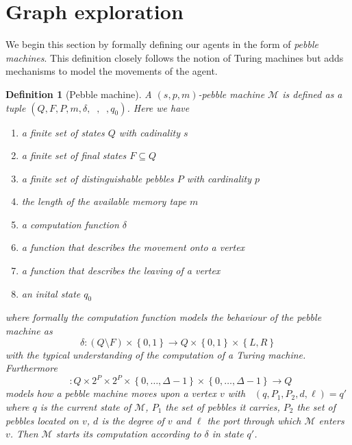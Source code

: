 \documentclass[oneside]{scrartcl}
\newtheorem{definition}{Definition}
\DeclareMathOperator{\din}{\delta_{\mathit{in}}}
\DeclareMathOperator{\dout}{\delta_{\mathit{out}}}
\begin{document}
\section{Graph exploration}
We begin this section by formally defining our agents in the form of
\emph{pebble machines}. This definition closely follows the notion of Turing
machines but adds mechanisms to model the movements of the agent.
\begin{definition}[Pebble machine]
  A $(s,p,m)$-\emph{pebble machine} $\mathcal{M}$ is defined as a tuple
  $(Q,F,P,m,\delta,\din,\dout,q_{0})$. Here we have
  \begin{enumerate}
    \item a finite set of states $Q$ with cadinality $s$
    \item a finite set of final states $F\subseteq Q$
    \item a finite set of distinguishable pebbles $P$ with cardinality $p$
    \item the length of the available memory tape $m$
    \item a computation function $\delta$
    \item a function that describes the movement onto a vertex
      $\din$
    \item a function that describes the leaving of a vertex $\dout$
    \item an inital state $q_{0}$
  \end{enumerate}
  where formally the computation function models the behaviour of the pebble
  machine as
  \begin{equation*}
    \delta\colon (Q\setminus F)\times\left\{0,1\right\}\rightarrow
    Q\times\left\{0,1\right\}\times\left\{L,R\right\}
  \end{equation*}
  with the typical understanding of the computation of a Turing machine.
  Furthermore
  \begin{equation*}
    \din\colon Q\times 2^{P}\times 2^{P}\times
    \left\{0,\dots,\Delta - 1\right\}\times\left\{0,\dots,\Delta - 1\right\}
    \rightarrow Q
  \end{equation*}
  models how a pebble machine moves upon a vertex $v$ with
  $\din(q,P_{1},P_{2},d,\ell) = q'$ where $q$ is the current state of
  $\mathcal{M}$, $P_{1}$ the set of pebbles it carries, $P_{2}$ the set
  of pebbles located on $v$, $d$ is the degree of $v$ and $\ell$ the port
  through which $\mathcal{M}$ enters $v$. Then $\mathcal{M}$ starts its
  computation according to $\delta$ in state $q'$.


\end{definition}
\end{document}
